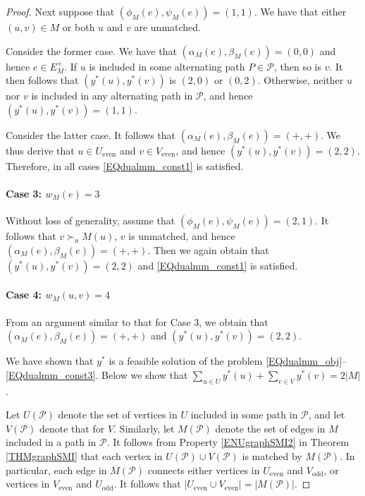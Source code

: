 \documentclass[11pt,a4paper,showkeys]{article}
\theoremstyle{plain}
\theoremstyle{definition}
\newcommand{\Ueven}{U_{\mathrm{even}}}
\newcommand{\Uodd}{U_{\mathrm{odd}}}
\newcommand{\Veven}{V_{\mathrm{even}}}
\newcommand{\Vodd}{V_{\mathrm{odd}}}
\begin{document}
\begin{proof}
    Next suppose that $(\phi_M(e), \psi_M(e))=(1,1)$. 
    We have that either $(u,v)\in M$ or both $u$ and $v$ are unmatched. 
    
    Consider the former case. 
    We have that 
    $(\alpha_M(e),\beta_M(e))=(0,0)$ and hence $e\in E_M^+$. 
    If $u$ is included in some alternating path $P\in \mathcal{P}$, 
    then so is $v$. 
    It then follows that $(y^*(u),y^*(v))$ is $(2,0)$ or $(0,2)$. 
    Otherwise, 
    neither $u$ nor $v$ is included in any alternating path in $\mathcal{P}$, 
    and hence $(y^*(u),y^*(v))=(1,1)$. 
    
    Consider the latter case. 
    It follows that $(\alpha_M(e),\beta_M(e))=(+,+)$. 
    We thus derive that $u\in \Ueven$ and $v\in \Veven$, 
    and hence $(y^*(u),y^*(v))=(2,2)$. 
    Therefore, 
    in all cases \eqref{EQdualmm_const1} is satisfied. 

    
    \paragraph{Case 3: $w_M(e) = 3$}
    Without loss of generality, 
    assume that $(\phi_M(e),\psi_M(e))=(2,1)$. 
    It follows that $v\succ_u M(u)$, $v$ is unmatched, and hence $(\alpha_M(e),\beta_M(e))=(+,+)$. 
    Then we again obtain that $(y^*(u),y^*(v))=(2,2)$ and \eqref{EQdualmm_const1} is satisfied. 
    
    \paragraph{Case 4: $w_M(u,v) = 4$}
    From an argument similar to that for Case 3, 
    we obtain that $(\alpha_M(e),\beta_M(e))=(+,+)$ and $(y^*(u),y^*(v))=(2,2)$. 

    \bigskip

    We have shown that $y^*$ is a feasible solution of the problem \eqref{EQdualmm_obj}--\eqref{EQdualmm_const3}. 
    Below we show that $\sum_{u\in U} y^*(u) + \sum_{v\in V} y^*(v) =2|M|$. 

    Let $U(\mathcal{P})$ denote the set of vertices in $U$ included in some path in $\mathcal{P}$, 
    and let $V(\mathcal{P})$ denote that for $V$. 
    Similarly, 
    let $M(\mathcal{P})$ denote the set of edges in $M$ included in a path in $\mathcal{P}$. 
    It follows from Property \ref{ENUgraphSMI2} in Theorem \ref{THMgraphSMI} that each vertex in $U(\mathcal{P}) \cup V(\mathcal{P})$ is matched by $M(\mathcal{P})$. 
    In particular, 
    each edge in $M(\mathcal{P})$ connects either vertices in $\Ueven$ and $\Vodd$, 
    or vertices in $\Veven$ and $\Uodd$. 
    It follows that $|\Ueven \cup \Veven|=|M(\mathcal{P})|$. 



\end{proof}
\end{document}
